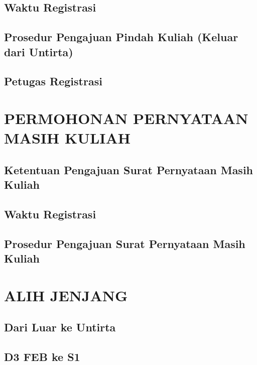 \documentclass[
]{book}
\begin{document}
\hypertarget{waktu-registrasi}{%
\section{Waktu Registrasi}\label{waktu-registrasi}}

\hypertarget{prosedur-pengajuan-pindah-kuliah-keluar-dari-untirta}{%
\section{Prosedur Pengajuan Pindah Kuliah (Keluar dari Untirta)}\label{prosedur-pengajuan-pindah-kuliah-keluar-dari-untirta}}

\hypertarget{petugas-registrasi}{%
\section{Petugas Registrasi}\label{petugas-registrasi}}

\hypertarget{permohonan-pernyataan-masih-kuliah}{%
\chapter{PERMOHONAN PERNYATAAN MASIH KULIAH}\label{permohonan-pernyataan-masih-kuliah}}

\hypertarget{ketentuan-pengajuan-surat-pernyataan-masih-kuliah}{%
\section{Ketentuan Pengajuan Surat Pernyataan Masih Kuliah}\label{ketentuan-pengajuan-surat-pernyataan-masih-kuliah}}

\hypertarget{waktu-registrasi}{%
\section{Waktu Registrasi}\label{waktu-registrasi}}

\hypertarget{prosedur-pengajuan-surat-pernyataan-masih-kuliah}{%
\section{Prosedur Pengajuan Surat Pernyataan Masih Kuliah}\label{prosedur-pengajuan-surat-pernyataan-masih-kuliah}}

\hypertarget{alih-jenjang}{%
\chapter{ALIH JENJANG}\label{alih-jenjang}}

\hypertarget{dari-luar-ke-untirta}{%
\section{Dari Luar ke Untirta}\label{dari-luar-ke-untirta}}

\hypertarget{d3-feb-ke-s1}{%
\section{D3 FEB ke S1}\label{d3-feb-ke-s1}}

  
\end{document}
